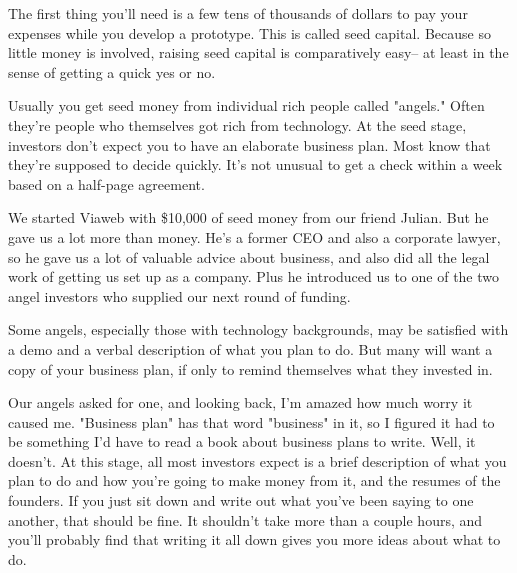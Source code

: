 The first thing you'll need is a few tens
                    of thousands of dollars to pay your expenses while you
                    develop a prototype. This is called seed capital. Because so
                    little money is involved, raising seed capital is
                    comparatively easy-- at least in the sense of getting a
                    quick yes or no.

Usually you get seed money from
                    individual rich people called "angels." Often they're people
                    who themselves got rich from technology. At the seed stage,
                    investors don't expect you to have an elaborate business
                    plan. Most know that they're supposed to decide quickly.
                    It's not unusual to get a check within a week based on a
                    half-page agreement.

We started Viaweb with
                    \$10,000 of seed money from our friend Julian. But he gave us
                    a lot more than money. He's a former CEO and also a
                    corporate lawyer, so he gave us a lot of valuable advice
                    about business, and also did all the legal work of getting
                    us set up as a company. Plus he introduced us to one of the
                    two angel investors who supplied our next round of
                    funding.

Some angels, especially those with
                    technology backgrounds, may be satisfied with a demo and a
                    verbal description of what you plan to do. But many will
                    want a copy of your business plan, if only to remind
                    themselves what they invested in.

Our angels
                    asked for one, and looking back, I'm amazed how much worry
                    it caused me. "Business plan" has that word "business" in
                    it, so I figured it had to be something I'd have to read a
                    book about business plans to write. Well, it doesn't. At
                    this stage, all most investors expect is a brief description
                    of what you plan to do and how you're going to make money
                    from it, and the resumes of the founders. If you just sit
                    down and write out what you've been saying to one another,
                    that should be fine. It shouldn't take more than a couple
                    hours, and you'll probably find that writing it all down
                    gives you more ideas about what to do.

